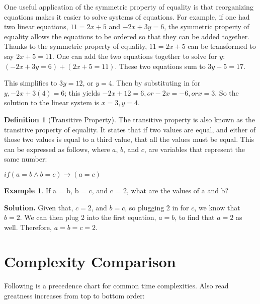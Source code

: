 \documentclass[a4paper,12pt]{article}
\theoremstyle{definition}
\newtheorem{example}{Example}[section]
\newtheorem{definition}{Definition}
\begin{document}
    One useful application of the symmetric property of equality is that reorganizing equations makes it easier
    to solve systems of equations. For example, if one had two linear equations, $11 = 2x + 5$ and $-2x + 3y = 6$,
    the symmetric property of equality allows the equations to be ordered so that they can be added together.
    Thanks to the symmetric property of equality, $11 = 2x + 5$ can be transformed to say $2x + 5 = 11$.
    One can add the two equations together to solve for $y$: $(-2x + 3y = 6) + (2x + 5 = 11)$.
    These two equations sum to $3y + 5 = 17$.

    This simplifies to $3y = 12$, or $y = 4$.
    Then by substituting in for $y, -2x + 3(4) = 6$; this yields $-2x + 12 = 6, or -2x = -6, or x = 3$.
    So the solution to the linear system is $x = 3, y = 4$.

    \begin{definition}[Transitive Property]
        The transitive property is also known as the transitive property of equality.
        It states that if two values are equal, and either of those two values is equal to a third value, that all
        the values must be equal.
        This can be expressed as follows, where $a$, $b$, and $c$, are variables that represent the same number:

        \begin{center}
            $if (a = b \wedge b = c) \rightarrow (a = c)$
        \end{center}
    \end{definition}

    \begin{example}
        If a = b, b = c, and c = 2, what are the values of a and b?
    \end{example}

    \noindent
    \textbf{Solution.}
    Given that, $c = 2$, and $b = c$, so plugging 2 in for $c$, we know that $b = 2$. We can then plug 2 into the first
    equation, $a = b$, to find that $a = 2$ as well.
    Therefore, $a = b = c = 2$.


    \section{Complexity Comparison}

    Following is a precedence chart for common time complexities.
    Also read greatness increases from top to bottom order:
\end{document}
